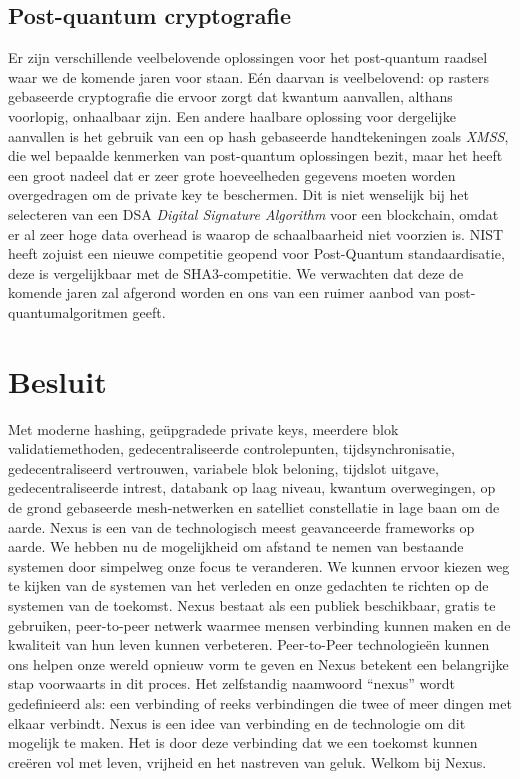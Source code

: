 \documentclass[11pt]{article}
\begin{document}
\subsection{Post-quantum cryptografie}

Er zijn verschillende veelbelovende oplossingen voor het post-quantum raadsel waar we de komende jaren voor staan. E\'en daarvan is veelbelovend: op rasters gebaseerde cryptografie die ervoor zorgt dat kwantum aanvallen, althans voorlopig, onhaalbaar zijn.
Een andere haalbare oplossing voor dergelijke aanvallen is het gebruik van een op hash gebaseerde handtekeningen zoals \textit{XMSS},  die wel bepaalde kenmerken van post-quantum oplossingen bezit, maar het heeft een groot nadeel dat er zeer grote hoeveelheden gegevens moeten worden overgedragen om de private key te beschermen.
Dit is niet wenselijk bij het selecteren van een DSA \textit{Digital Signature Algorithm} voor een blockchain, omdat er al zeer hoge data overhead is waarop de schaalbaarheid niet voorzien is.
NIST heeft zojuist een nieuwe competitie geopend voor Post-Quantum standaardisatie, deze is vergelijkbaar met de SHA3-competitie. We verwachten dat deze de komende jaren zal afgerond worden en ons van een ruimer aanbod van post-quantumalgoritmen  geeft. \cite{NIST_POST_QUANTUM} 

\section{Besluit}

Met moderne hashing, geüpgradede private keys, meerdere blok validatiemethoden, gedecentraliseerde controlepunten, tijdsynchronisatie, gedecentraliseerd vertrouwen, variabele blok beloning, tijdslot uitgave, gedecentraliseerde intrest, databank op laag niveau, kwantum overwegingen, op de grond gebaseerde mesh-netwerken en satelliet constellatie in lage baan om de aarde. Nexus is een van de technologisch meest geavanceerde frameworks op aarde. We hebben nu de mogelijkheid om afstand te nemen van bestaande systemen door simpelweg onze focus te veranderen. We kunnen ervoor kiezen weg te kijken van de systemen van het verleden en onze gedachten te richten op de systemen van de toekomst. Nexus bestaat als een publiek beschikbaar, gratis te gebruiken, peer-to-peer netwerk waarmee mensen verbinding kunnen maken en de kwaliteit van hun leven kunnen verbeteren. Peer-to-Peer technologieën kunnen ons helpen onze wereld opnieuw vorm te geven en Nexus betekent een belangrijke stap voorwaarts in dit proces. Het zelfstandig naamwoord ``nexus'' wordt gedefinieerd als: een verbinding of reeks verbindingen die twee of meer dingen met elkaar verbindt. Nexus is een idee van verbinding en de technologie om dit mogelijk te maken. Het is door deze verbinding dat we een toekomst kunnen creëren vol met leven, vrijheid en het nastreven van geluk. Welkom bij Nexus.
\pagebreak
\end{document}
